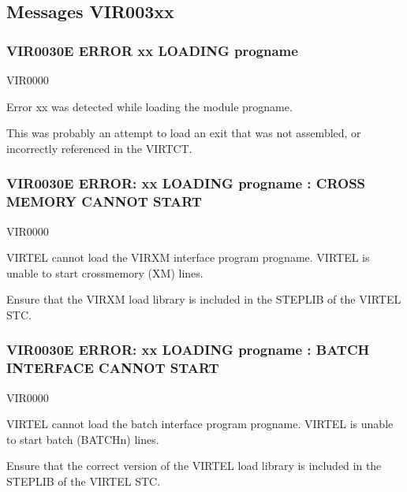 \documentclass[letterpaper,10pt,english]{sphinxmanual}
\begin{document}
\subsection{Messages VIR003xx}
\label{\detokenize{messages:messages-vir003xx}}

\subsubsection{VIR0030E ERROR xx LOADING progname}
\label{\detokenize{messages:vir0030e-error-xx-loading-progname}}\begin{description}
\sphinxAtStartPar
VIR0000

\sphinxAtStartPar
Error xx was detected while loading the module progname.

\sphinxAtStartPar
This was probably an attempt to load an exit that was not assembled, or incorrectly referenced in the VIRTCT.

\end{description}


\subsubsection{VIR0030E ERROR: xx LOADING progname : CROSS MEMORY CANNOT START}
\label{\detokenize{messages:vir0030e-error-xx-loading-progname-cross-memory-cannot-start}}\begin{description}
\sphinxAtStartPar
VIR0000

\sphinxAtStartPar
VIRTEL cannot load the VIRXM interface program progname. VIRTEL is unable to start cross\sphinxhyphen{}memory (XM) lines.

\sphinxAtStartPar
Ensure that the VIRXM load library is included in the STEPLIB of the VIRTEL STC.

\end{description}


\subsubsection{VIR0030E ERROR: xx LOADING progname : BATCH INTERFACE CANNOT START}
\label{\detokenize{messages:vir0030e-error-xx-loading-progname-batch-interface-cannot-start}}\begin{description}
\sphinxAtStartPar
VIR0000

\sphinxAtStartPar
VIRTEL cannot load the batch interface program progname. VIRTEL is unable to start batch (BATCHn) lines.

\sphinxAtStartPar
Ensure that the correct version of the VIRTEL load library is included in the STEPLIB of the VIRTEL STC.

\end{description}
\end{document}
